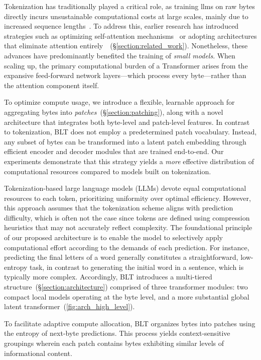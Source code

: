 Tokenization has traditionally played a critical role, as training llms on raw bytes directly incurs unsustainable computational costs at large scales, mainly due to increased sequence lengths~\citep{xue2022byt5}. To address this, earlier research has introduced strategies such as optimizing self-attention mechanisms~\citep{el2020characterbert, clark2022canine} or adopting architectures that eliminate attention entirely~\citep{wang2024mambabyte}~(\S\ref{section:related_work}). Nonetheless, these advances have predominantly benefited the training of \textit{small models}. When scaling up, the primary computational burden of a Transformer arises from the expansive feed-forward network layers—which process every byte—rather than the attention component itself.

To optimize compute usage, we introduce a flexible, learnable approach for aggregating bytes into \textit{patches}~(\S\ref{section:patching}), along with a novel architecture that integrates both byte-level and patch-level features. In contrast to tokenization, {\textsc BLT} does not employ a predetermined patch vocabulary. Instead, any subset of bytes can be transformed into a latent patch embedding through efficient encoder and decoder modules that are trained end-to-end. Our experiments demonstrate that this strategy yields a \textit{more} effective distribution of computational resources compared to models built on tokenization.

Tokenization-based large language models (LLMs) devote equal computational resources to each token, prioritizing uniformity over optimal efficiency. However, this approach assumes that the tokenization scheme aligns with prediction difficulty, which is often not the case since tokens are defined using compression heuristics that may not accurately reflect complexity. The foundational principle of our proposed architecture is to enable the model to selectively apply computational effort according to the demands of each prediction. For instance, predicting the final letters of a word generally constitutes a straightforward, low-entropy task, in contrast to generating the initial word in a sentence, which is typically more complex. Accordingly, {\textsc BLT} introduces a multi-tiered structure~(\S\ref{section:architecture}) comprised of three transformer modules: two compact local models operating at the byte level, and a more substantial global latent transformer~(\autoref{fig:arch_high_level}). 

To facilitate adaptive compute allocation, {\textsc BLT} organizes bytes into patches using the entropy of next-byte predictions. This process yields context-sensitive groupings wherein each patch contains bytes exhibiting similar levels of informational content.


